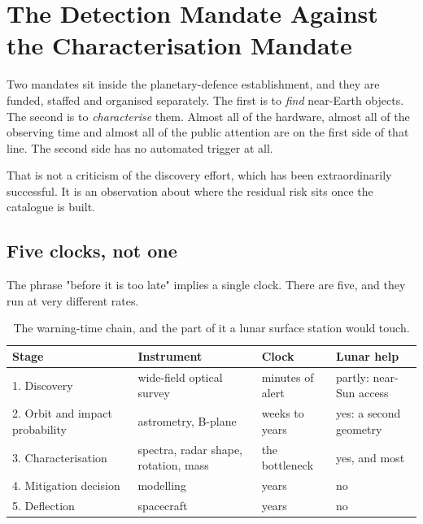 
\chapter{The Detection Mandate Against the Characterisation Mandate}
\label{ch:mandates}

Two mandates sit inside the planetary-defence establishment, and they are
funded, staffed and organised separately. The first is to \emph{find}
near-Earth objects. The second is to \emph{characterise} them. Almost all of
the hardware, almost all of the observing time and almost all of the
public attention are on the first side of that line. The second side has no
automated trigger at all.

That is not a criticism of the discovery effort, which has been extraordinarily
successful. It is an observation about where the residual risk sits once the
catalogue is built.

\section{Five clocks, not one}

The phrase "before it is too late" implies a single clock. There are five, and
they run at very different rates.

\begin{table}[!htbp]
\centering
\small
\caption{The warning-time chain, and the part of it a lunar surface station
would touch.}
\label{tab:clocks}
\begin{tabularx}{\textwidth}{@{}P{0.72in}P{1.12in}P{0.87in}Y@{}}
\toprule
{}
\textbf{Stage} & \textbf{Instrument} & \textbf{Clock} & \textbf{Lunar help} \\
. Discovery & wide-field optical survey & minutes of alert & partly: near-Sun
access \\
2. Orbit and impact probability & astrometry, B-plane & weeks to years & yes: a
second geometry \\
3. Characterisation & spectra, radar shape, rotation, mass & the bottleneck &
yes, and most \\
4. Mitigation decision & modelling & years & no \\
5. Deflection & spacecraft & years & no \\
\bottomrule
\end{tabularx}
\end{table}

